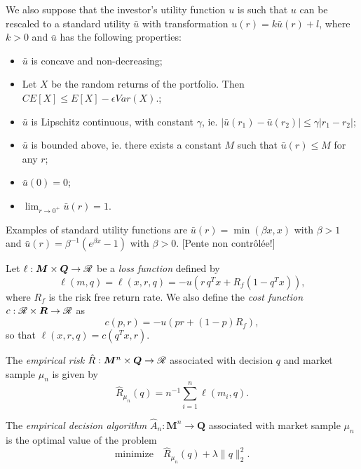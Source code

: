 \documentclass[11pt]{article}
\begin{document}
\begin{assumption}
  We also suppose that the investor's utility function $u$ is such that $u$ can be
  rescaled to a standard utility $\bar u$ with transformation $u(r) = k\bar u(r) + l$,
  where $k>0$ and $\bar u$ has the following properties:
  \begin{itemize}
  \item $\bar u$ is concave and non-decreasing;
  \item Let $X$ be the random returns of the portfolio. Then
    $CE[X] \leq E[X] - \epsilon Var(X)$.;
  \item $\bar u$ is Lipschitz continuous, with constant $\gamma$, ie.
    $|\bar u(r_1) - \bar u(r_2)| \leq \gamma|r_1-r_2|$;
  \item $\bar u$ is bounded above, ie. there exists a constant $M$ such that $\bar
    u(r)\leq M$ for any $r$;
  \item $\bar u(0) = 0$;
  \item $\lim_{r\to 0^{+}} \bar u(r) = 1$.
  \end{itemize}
  Examples of standard utility functions are $\bar u(r) = \min(\beta x,x)$ with
  $\beta > 1$ and $\bar u(r) = \beta^{-1}(e^{\beta x}-1)$ with $\beta>0$. [Pente non
  contrôlée!]
\end{assumption}

\begin{deff}
  Let $\ell:\bm M\times \bm Q\to\mathscr{R}$ be a \textsl{loss function} defined by
  \begin{equation*}
    \ell(m,q) = \ell(x,r,q) = -u(r\,q^{T}x + R_f (1 - q^{T}x)),
  \end{equation*}
  where $R_f$ is the risk free return rate. We also define the \textsl{cost function}
  $c:\mathscr{R}\times\bm R\to\mathscr{R}$ as
  \begin{equation*}
    c(p,r) = -u(pr + (1-p)R_f),
  \end{equation*}
  so that $\ell(x,r,q) = c(q^Tx,r)$. 
\end{deff}

\begin{deff}
  The \textsl{empirical risk} $\hat R: \bm M^n\times \bm Q \to \mathscr{R}$ associated with decision
  $q$ and market sample $\mu_n$ is given by
 \begin{equation*}
   \hat R_{\mu_n}(q) = n^{-1} \sum_{i=1}^n \ell(m_i,q).
 \end{equation*}
\end{deff}

\begin{deff}
  The \textsl{empirical decision algorithm} $\hat A_n:\bm M^n \to \bm Q$ associated with
  market sample $\mu_n$ is the optimal value of the problem
  \begin{equation*}
    \text{minimize}\quad\hat R_{\mu_n}(q) + \lambda\|q\|_2^2.
  \end{equation*}
\end{deff}
\end{document}
